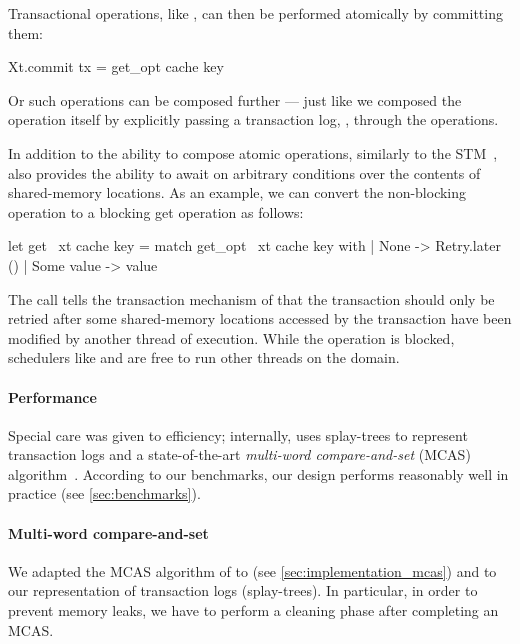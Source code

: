 Transactional operations, like , can then be performed atomically by committing them:
\begin{ocamlcode}
Xt.commit { tx = get_opt cache key }
\end{ocamlcode}
Or such operations can be composed further --- just like we
composed the  operation itself by explicitly passing a transaction log, , through the operations.

In addition to the ability to compose atomic operations, similarly to the \Haskell STM~\citep{DBLP:conf/ppopp/HarrisMPH05}, \Kcas also provides the ability to await on arbitrary conditions over the contents of shared-memory locations.
As an example, we can convert the non-blocking  operation to a blocking get operation as follows:
\begin{ocamlcode}
let get ~xt cache key =
match get_opt ~xt cache key with
| None -> Retry.later ()
| Some value -> value
\end{ocamlcode}
The  call tells the transaction mechanism of \Kcas that the transaction should only be retried after some shared-memory locations accessed by the transaction have been modified by another thread of execution.
While the operation is blocked, schedulers like \Eio and \Domainslib are free to run other threads on the domain.

\paragraph{Performance}

Special care was given to efficiency; internally, \Kcas uses splay-trees to represent transaction logs and a state-of-the-art \emph{multi-word compare-and-set} (MCAS) algorithm~\citep{DBLP:conf/wdag/GuerraouiKMZ20}.
According to our benchmarks, our design performs reasonably well in practice (see \cref{sec:benchmarks}).

\paragraph{Multi-word compare-and-set}

We adapted the MCAS algorithm of \citet{DBLP:conf/wdag/GuerraouiKMZ20} to \OCaml (see \cref{sec:implementation_mcas}) and to our representation of transaction logs (splay-trees).
In particular, in order to prevent memory leaks, we have to perform a cleaning phase after completing an MCAS.

